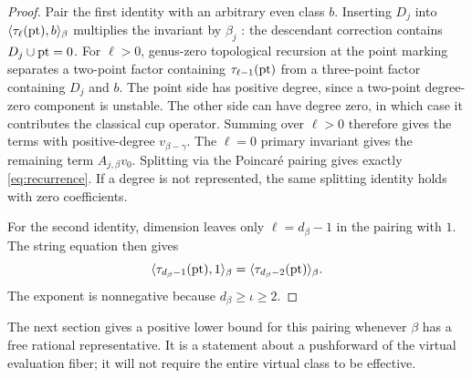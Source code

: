 \begin{proof}
Pair the first identity with an arbitrary even class $b$. Inserting
$D_j$ into $\langle\tau_\ell(\mathrm{pt}),b\rangle_\beta$ multiplies the invariant
by $\beta_j$ \cite[Lemma~1.4, equation~(12)]{KontsevichManinDescendants}: the descendant correction contains
$D_j\cup\mathrm{pt}=0$. For $\ell>0$, genus-zero topological recursion at the
point marking \cite[equation~(4a)]{KontsevichManinDescendants} separates a two-point factor containing
$\tau_{\ell-1}(\mathrm{pt})$ from a three-point factor containing $D_j$ and $b$.
The point side has positive degree, since a two-point degree-zero
component is unstable. The other side can have degree zero, in which
case it contributes the classical cup operator. Summing over $\ell>0$
therefore gives the terms with positive-degree $v_{\beta-\gamma}$.
The $\ell=0$ primary invariant gives the remaining term
$A_{j,\beta}v_0$. Splitting via the Poincar\'e pairing gives exactly
\eqref{eq:recurrence}. If a degree is not represented, the same splitting
identity holds with zero coefficients.

For the second identity, dimension leaves only $\ell=d_\beta-1$ in the
pairing with $1$. The string equation \cite[\S1.2, p.~311]{PandharipandeDescendants} then gives
\[
 \langle\tau_{d_\beta-1}(\mathrm{pt}),1\rangle_\beta
 =\langle\tau_{d_\beta-2}(\mathrm{pt})\rangle_\beta.
\]
The exponent is nonnegative because $d_\beta\ge\iota\ge2$.
\end{proof}

The next section gives a positive lower bound for this pairing whenever
$\beta$ has a free rational representative. It is a statement about a
pushforward of the virtual evaluation fiber; it will not require the
entire virtual class to be effective.
